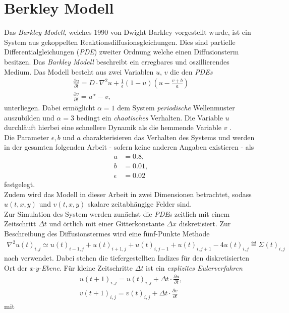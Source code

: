 \section{Berkley Modell}
Das \textit{Barkley Modell}, welches 1990 von Dwight Barkley vorgestellt wurde, ist ein System aus gekoppelten Reaktionsdiffusionsgleichungen. Dies sind partielle Differentialgleichungen (\textit{PDE}) zweiter Ordnung welche einen Diffusionsterm besitzen. Das \textit{Barkley Modell} beschreibt ein erregbares und oszillierendes Medium. Das Modell besteht aus zwei Variablen $u$, $v$ die den  \textit{PDEs}
\begin{equation}
\begin{gathered}
\frac{\partial u}{\partial t} = D \cdot \nabla^2 u + \frac{1}{\epsilon} (1-u) \left(u-\frac{v+b}{a}\right)\\
\frac{\partial v}{\partial t} = u^\alpha-v,
\end{gathered}
\end{equation}
unterliegen. Dabei ermöglicht $\alpha=1$ dem System \textit{periodische} Wellenmuster auszubilden und $\alpha=3$ bedingt ein \textit{chaotisches} Verhalten. Die Variable $u$ durchläuft hierbei eine schnellere Dynamik als die hemmende Variable $v$ \citep{Barkley:2008, berg2011synchronization}.\\
Die Parameter $\epsilon, b$ und $a$ charakterisieren das Verhalten des Systems und werden in der gesamten folgenden Arbeit - sofern keine anderen Angaben existieren - als
\begin{align*}
a &= 0.8,\\ b &= 0.01,\\ \epsilon &= 0.02
\end{align*}
festgelegt.\\
Zudem wird das Modell in dieser Arbeit in zwei Dimensionen betrachtet, sodass $u(t, x,y)$ und $v(t, x,y)$ skalare zeitabhängige Felder sind.\\
Zur Simulation des System werden zunächst die \textit{PDE}s zeitlich mit einem Zeitschritt $\Delta t$ und örtlich mit einer Gitterkonstante $\Delta x$ diskretisiert. Zur Beschreibung des Diffusionstermes wird eine fünf-Punkte Methode
\begin{align}
\nabla^2 u(t)_{i,j} \simeq u(t)_{i-1, j} + u(t)_{i+1,j} + u(t)_{i,j-1} + u(t)_{i,j+1} - 4 u(t)_{i,j} \eqdef \Sigma(t)_{i,j}
\end{align} 
nach \citep{Barkley:2008} verwendet. Dabei stehen die tiefergestellten Indizes für den diskretisierten Ort der \textit{x-y-Ebene}.
Für kleine Zeitschritte $\Delta t$ ist ein \textit{explizites Eulerverfahren}
\begin{equation}
\begin{gathered}
u(t+1)_{i,j} = u(t)_{i,j} + \Delta t \cdot \frac{\partial u}{\partial t},\\
v(t+1)_{i,j} = v(t)_{i,j} + \Delta t \cdot \frac{\partial v}{\partial t}
\end{gathered}
\end{equation}
mit

